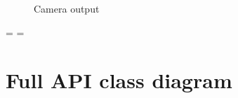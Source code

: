 \documentclass{projdoc}
\begin{document}
\begin{figure}
	\centering
	\caption{Camera  output}
	\label{fig:poc-output-camera}
\end{figure}

\makeatletter%
\newbox\full@class@diag%
\newlength\full@class@diag@width%
\newlength\full@class@diag@height%
\savebox{}%
\settowidth\full@class@diag@width{\usebox\full@class@diag}%
\settoheight\full@class@diag@height{\usebox\full@class@diag}%
\begingroup%
\eject%
\thispagestyle{empty}%
\pdfpagewidth=\full@class@diag@width%
\pdfpageheight=\full@class@diag@height%
\AddToShipoutPictureBG*{%
  \AtPageUpperLeft{%
		\raisebox{-\full@class@diag@height}{%
			\usebox\full@class@diag%
		}%
	}%
}%
\section{Full API class diagram}%
\newpage%
\endgroup%
\makeatother%
\end{document}
